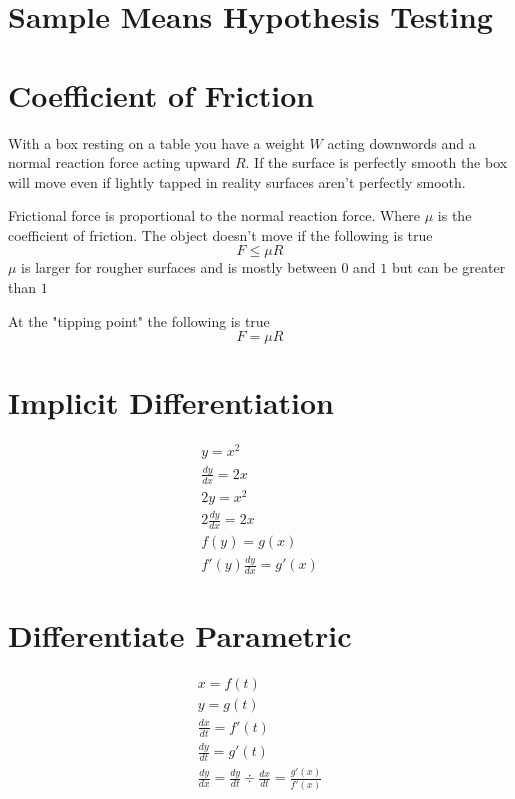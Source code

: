 \documentclass{article}
\begin{document}
\section{Sample Means Hypothesis Testing}



\section{Coefficient of Friction}

With a box resting on a table you have a weight $W$ acting downwords and a normal reaction force acting upward $R$. If the surface is perfectly smooth the box will move even if lightly tapped
in reality surfaces aren't perfectly smooth.

Frictional force is proportional to the normal reaction force.
Where $\mu$ is the coefficient of friction. The object doesn't move if the following is true
\begin{equation}
	F \le \mu R
\end{equation}
$\mu$ is larger for rougher surfaces and is mostly between $0$ and $1$ but can be greater than $1$

At the "tipping point" the following is true
\begin{equation}
	F = \mu R
\end{equation}

\section{Implicit Differentiation}

\begin{gather}
	y = x^2 \\
	\frac{dy}{dx} = 2x \\
	2y = x^2 \\
	2\frac{dy}{dx} = 2x \\
	f(y) = g(x) \\
	f'(y)\frac{dy}{dx} = g'(x)
\end{gather}

\section{Differentiate Parametric}
\begin{gather}
  x = f(t) \\
  y = g(t) \\
  \frac{dx}{dt} = f'(t) \\
  \frac{dy}{dt} = g'(t) \\
  \frac{dy}{dx} = \frac{dy}{dt} \div \frac{dx}{dt} = \frac{g'(x)}{f'(x)}
  \end{gather}
\end{document}
